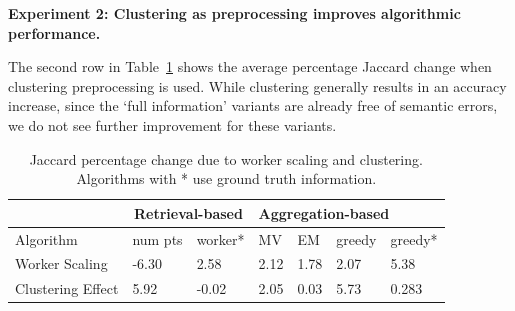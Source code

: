 \documentclass[letterpaper]{article}
\newcommand{\agp}[1]{\textcolor{magenta}{Aditya: #1}}
\newcommand{\dor}[1]{\textcolor{blue}{Doris: #1}}
\newcommand{\stitle}[1]{\noindent \textbf{#1}}
\begin{document}
\stitle{Experiment 2: Clustering as preprocessing improves algorithmic performance.}
\par \noindent The second row in Table~\ref{statsTable} shows the average percentage Jaccard change when clustering preprocessing is used. While clustering generally results in an accuracy increase, since the `full information' variants are already free of semantic errors, we do not see further improvement for these variants. %
\begin{table}[h!]
   \small
     \setlength\tabcolsep{1.5pt}
      \begin{tabular}{l|l|l|l|l|l|l}
         & \multicolumn{2}{c|}{Retrieval-based} & \multicolumn{4}{l}{Aggregation-based} \\ \hline
      Algorithm         & num pts         & worker*        & MV    & EM    & greedy  & greedy*  \\ \hline
      Worker Scaling    & -6.30           & 2.58               & 2.12  & 1.78  & 2.07   & 5.38        \\ \hline
      Clustering Effect & 5.92            & -0.02              & 2.05  & 0.03  & 5.73    & 0.283       
      \end{tabular}
      \caption{Jaccard percentage change due to worker scaling and clustering. Algorithms with * use ground truth information.}
      \label{statsTable}
\end{table}


\end{document}
